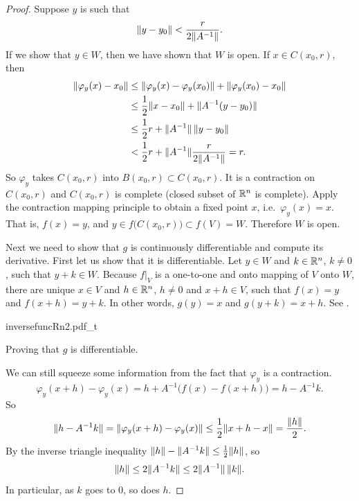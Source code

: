 \begin{proof}
Suppose $y$ is such that
\begin{equation*}
\lVert {y-y_0} \rVert <
\frac{r}{2\lVert {A^{-1}} \rVert} .
\end{equation*}
If we show that $y \in W$, then we have shown that $W$ is open.
If $x \in
C(x_0,r)$, then
\begin{equation*}
\begin{split}
\lVert {\varphi_y(x)-x_0} \rVert
& \leq
\lVert {\varphi_y(x)-\varphi_y(x_0)} \rVert +
\lVert {\varphi_y(x_0)-x_0} \rVert \\
& \leq
\frac{1}{2}\lVert {x-x_0} \rVert +
\lVert {A^{-1}(y-y_0)} \rVert \\
& \leq
\frac{1}{2}r +
\lVert {A^{-1}} \rVert \, \lVert {y-y_0} \rVert \\
& <
\frac{1}{2}r +
\lVert {A^{-1}} \rVert
\frac{r}{2\lVert {A^{-1}} \rVert} = r .
\end{split}
\end{equation*}
So $\varphi_y$ takes $C(x_0,r)$ into $B(x_0,r) \subset C(x_0,r)$.  It is a
contraction on $C(x_0,r)$ and $C(x_0,r)$ is complete (closed subset of ${\mathbb{R}}^n$
is complete).
Apply the contraction mapping principle to obtain a fixed point $x$,
i.e.\ $\varphi_y(x) = x$.  That is, $f(x) = y$, and $y \in
f\bigl(C(x_0,r)\bigr) \subset f(V) = W$.  Therefore $W$ is open.

Next we need to show that $g$ is continuously differentiable and compute
its derivative.  First let us show that it is differentiable.
Let $y \in W$ and $k \in {\mathbb{R}}^n$, $k\not= 0$, such that $y+k \in W$.
Because $f|_V$ is a one-to-one and onto mapping of $V$ onto $W$,
there are unique
$x \in V$ and $h \in {\mathbb{R}}^n$, $h \not= 0$ and $x+h \in V$, such that
$f(x) = y$ and $f(x+h) = y+k$.
In other words, $g(y) = x$ and $g(y+k) = x+h$.  See
.
\begin{myfigureht}
{inversefuncRn2.pdf_t}
\caption{Proving that $g$ is differentiable.\label{fig:inversefuncRn2}}
\end{myfigureht}

We can still
squeeze some information from the fact that $\varphi_y$ is a contraction.
\begin{equation*}
\varphi_y(x+h)-\varphi_y(x) = h + A^{-1} \bigl( f(x)-f(x+h) \bigr) = h - A^{-1} k .
\end{equation*}
So
\begin{equation*}
\lVert {h-A^{-1}k} \rVert = \lVert {\varphi_y(x+h)-\varphi_y(x)} \rVert \leq
\frac{1}{2}\lVert {x+h-x} \rVert = \frac{\lVert {h} \rVert}{2}.
\end{equation*}
By the inverse triangle inequality $\lVert {h} \rVert - \lVert {A^{-1}k} \rVert \leq
\frac{1}{2}\lVert {h} \rVert$, so
\begin{equation*}
\lVert {h} \rVert \leq 2 \lVert {A^{-1}k} \rVert \leq 2 \lVert {A^{-1}} \rVert \, \lVert {k} \rVert.
\end{equation*}
In particular, as $k$ goes to 0, so does $h$.


\end{proof}
